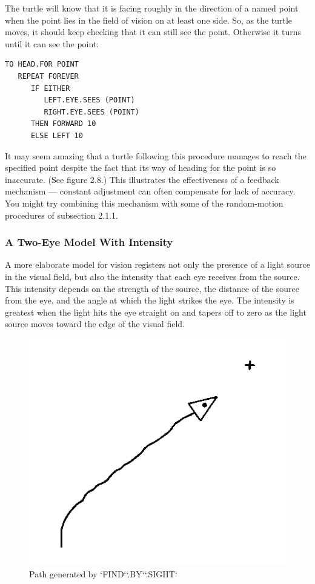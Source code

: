 \documentclass{book}
\begin{document}
The turtle will know that it is facing roughly in the direction of a
named point when the point lies in the field of vision on at least one
side. So, as the turtle moves, it should keep checking that it can still
see the point. Otherwise it turns until it can see the point:

\begin{verbatim}
TO HEAD.FOR POINT
   REPEAT FOREVER
      IF EITHER
         LEFT.EYE.SEES (POINT)
         RIGHT.EYE.SEES (POINT)
      THEN FORWARD 10
      ELSE LEFT 10
\end{verbatim}
It may seem amazing that a turtle following this procedure manages to
reach the specified point despite the fact that its way of heading for the
point is so inaccurate. (See figure 2.8.) This illustrates the effectiveness
of a feedback mechanism --- constant adjustment can often compensate
for lack of accuracy. You might try combining this mechanism with
some of the random-motion procedures of subsection 2.1.1.

\subsubsection{A Two-Eye Model With Intensity}

A more elaborate model for vision registers not only the presence of
a light source in the visual field, but also the intensity that each eye
receives from the source. This intensity depends on the strength of the
source, the distance of the source from the eye, and the angle at which
the light strikes the eye. The intensity is greatest when the light hits the
eye straight on and tapers off to zero as the light source moves toward
the edge of the visual field.

\begin{figure}
\begin{center}
\includegraphics[scale=1]{fig2-9}
\caption{Path generated by \textsc{`FIND`}\textsc{`.BY`}\textsc{`.SIGHT`}}
\end{center}
\end{figure}
\end{document}
